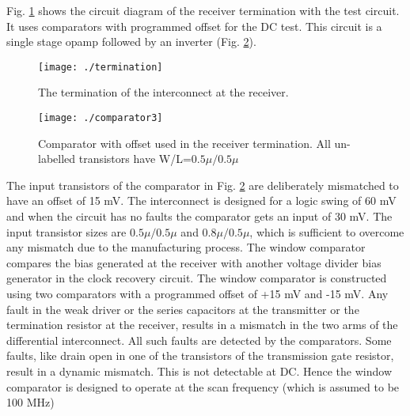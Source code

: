 \documentclass[conference]{IEEEtran}
\begin{document}
Fig. \ref{fig:term-adc} shows the circuit
diagram of the receiver termination with the test circuit.
It uses comparators with programmed offset for the DC test. 
This circuit is a single 
stage opamp followed by an inverter (Fig. \ref{fig:dc-comp}). 

\begin{figure}[h!]
\centering
{}
\texttt{[image: ./termination]}
\caption{The termination of the interconnect at the receiver.}
\label{fig:term-adc}
\end{figure}
\begin{figure}[h]
\centering
{}
\texttt{[image: ./comparator3]}
\caption{Comparator with offset used in the receiver termination. All
un-labelled transistors have W/L=$0.5\mu /0.5\mu$}
\label{fig:dc-comp}
\end{figure}
The input transistors of the comparator in Fig. \ref{fig:dc-comp} are 
deliberately mismatched to have an offset of 15 mV.
The interconnect is designed for a logic swing of 60 mV and
when the circuit has no faults the comparator gets an input of 30 mV. 
The input transistor sizes are $0.5\mu /0.5\mu $ and $0.8\mu /0.5\mu $,
which is sufficient to overcome any mismatch due to the manufacturing process.
The window comparator compares the bias generated
at the receiver with another voltage divider bias generator in the clock recovery
circuit. The window comparator is constructed using two comparators with a
programmed offset of +15 mV and -15 mV. 
Any fault in the weak driver or the series capacitors at the transmitter
or the termination resistor at the receiver,
results in a mismatch in the two arms of the differential interconnect. 
All such faults are detected by the comparators. Some faults, like drain open
in one of the transistors of the transmission gate resistor, result in a 
dynamic mismatch. This is not detectable at DC. Hence the window comparator
is designed to operate at the scan frequency (which is assumed to be 100 MHz) 
\end{document}
